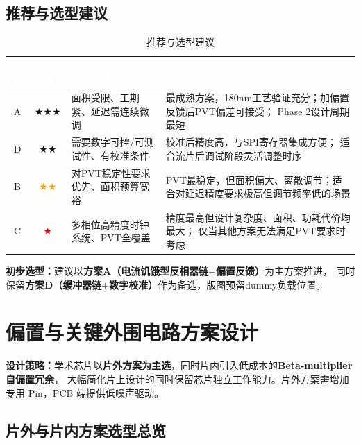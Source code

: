 \documentclass[12pt,a4paper,fontset=none]{ctexart}
\newcommand{\needtable}{\needspace{6cm}}   %
\begin{document}
\needtable
\subsection{推荐与选型建议}

\begin{table}[H]
\centering
\caption{推荐与选型建议}
\scriptsize
\begin{tabular}{@{}ccL{3.2cm}L{4.8cm}@{}}
\toprule
{}
\textcolor{white}{\textbf{方案}} &
\textcolor{white}{\textbf{推荐度}} &
\textcolor{white}{\textbf{适用场景}} &
\textcolor{white}{\textbf{选型理由}} \\
\midrule
A & \textcolor{green!50!black}{\textbf{$\bigstar\bigstar\bigstar$}} &
面积受限、工期紧、延迟需连续微调 &
最成熟方案，180nm工艺验证充分；加偏置反馈后PVT偏差可接受；
Phase 2设计周期最短 \\
\midrule
D & \textcolor{green!50!black}{\textbf{$\bigstar\bigstar$}} &
需要数字可控/可测试性、有校准条件 &
校准后精度高，与SPI寄存器集成方便；
适合流片后调试阶段灵活调整时序 \\
\midrule
B & \textcolor{orange}{$\bigstar\bigstar$} &
对PVT稳定性要求优先、面积预算宽裕 &
PVT最稳定，但面积偏大、离散调节；适合对延迟精度要求极高但调节频率低的场景 \\
\midrule
C & \textcolor{red}{$\bigstar$} &
多相位高精度时钟系统、PVT全覆盖 &
精度最高但设计复杂度、面积、功耗代价均最大；
仅当其他方案无法满足PVT要求时考虑 \\
\bottomrule
\end{tabular}
\end{table}

\textbf{初步选型：}建议以\textbf{方案A（电流饥饿型反相器链$+$偏置反馈）}为主方案推进，
同时保留\textbf{方案D（缓冲器链$+$数字校准）}作为备选，版图预留dummy负载位置。

\newpage
\needtable
\section{偏置与关键外围电路方案设计}

\textbf{设计策略：}学术芯片以\textbf{片外方案为主选}，同时片内引入低成本的\textbf{Beta-multiplier 自偏置冗余}，
大幅简化片上设计的同时保留芯片独立工作能力。片外方案需增加专用 Pin，PCB 端提供低噪声驱动。

\needtable
\subsection{片外与片内方案选型总览}
\end{document}
